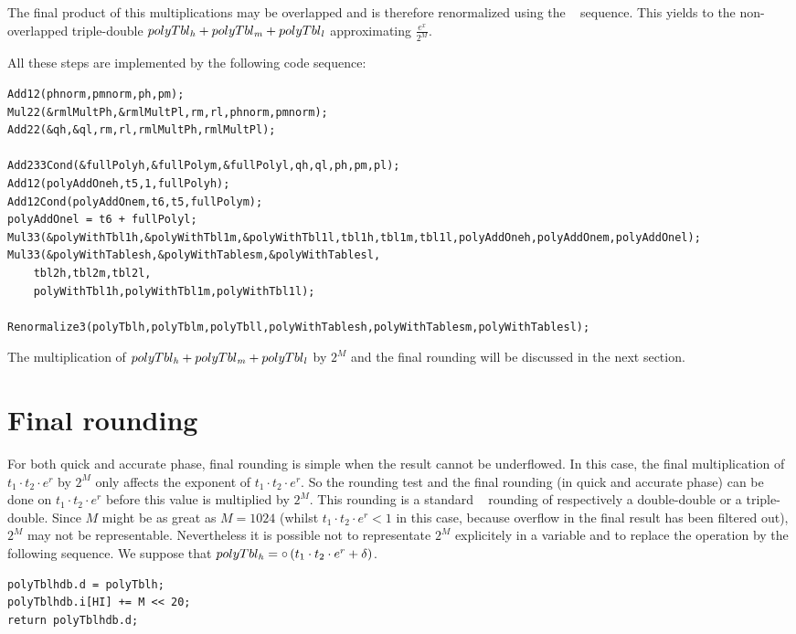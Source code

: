 The final product of this multiplications may be overlapped and is
therefore renormalized using the \Renormalize~ sequence. This yields
to the non-overlapped triple-double $polyTbl_{\mathit{h}} + polyTbl_{\mathit{m}} +
polyTbl_{\mathit{l}}$ approximating $\frac{e^x}{2^M}$.

All these steps are implemented by the following code sequence:
\begin{lstlisting}[caption={Accurate phase reconstruction},firstnumber=1]
Add12(phnorm,pmnorm,ph,pm);
Mul22(&rmlMultPh,&rmlMultPl,rm,rl,phnorm,pmnorm);
Add22(&qh,&ql,rm,rl,rmlMultPh,rmlMultPl);

Add233Cond(&fullPolyh,&fullPolym,&fullPolyl,qh,ql,ph,pm,pl);
Add12(polyAddOneh,t5,1,fullPolyh);
Add12Cond(polyAddOnem,t6,t5,fullPolym);
polyAddOnel = t6 + fullPolyl;
Mul33(&polyWithTbl1h,&polyWithTbl1m,&polyWithTbl1l,tbl1h,tbl1m,tbl1l,polyAddOneh,polyAddOnem,polyAddOnel);
Mul33(&polyWithTablesh,&polyWithTablesm,&polyWithTablesl,
	tbl2h,tbl2m,tbl2l,
	polyWithTbl1h,polyWithTbl1m,polyWithTbl1l);

Renormalize3(polyTblh,polyTblm,polyTbll,polyWithTablesh,polyWithTablesm,polyWithTablesl);
\end{lstlisting}

The multiplication of $polyTbl_{\mathit{h}} + polyTbl_{\mathit{m}} + polyTbl_{\mathit{l}}$ by
$2^M$ and the final rounding will be discussed in the next section.

\section{Final rounding}\label{sec:expfinalround}
For both quick and accurate phase, final rounding is simple when the
result cannot be underflowed. In this case, the final multiplication
of $t_1 \cdot t_2 \cdot e^r$ by $2^M$ only affects the exponent of $t_1
\cdot t_2 \cdot e^r$. So the rounding test and the final rounding (in
quick and accurate phase) can be done on $t_1 \cdot t_2 \cdot e^r$
before this value is multiplied by $2^M$. This rounding is a standard
\crlibm~ rounding of respectively a double-double or a
triple-double. Since $M$ might be as great as $M = 1024$ (whilst $t_1
\cdot t_2 \cdot e^r < 1$ in this case, because overflow in the final
result has been filtered out), $2^M$ may not be
representable. Nevertheless it is possible not to representate
$2^M$ explicitely in a variable and to replace the operation by the
following sequence. We suppose that $polyTbl_{\mathit{h}} = \circ \left( t_1
\cdot t_2 \cdot e^r + \delta \right)$.
\begin{lstlisting}[caption={Final multiplication by $2^M$},firstnumber=1]
polyTblhdb.d = polyTblh;
polyTblhdb.i[HI] += M << 20;
return polyTblhdb.d;
\end{lstlisting}

